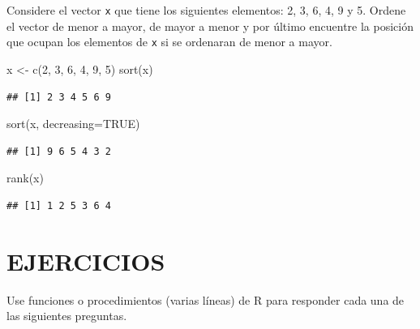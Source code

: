 \documentclass[
]{book}
\makeatletter
\newenvironment{Shaded}{\begin{snugshade}}{\end{snugshade}}
\newcommand{\AttributeTok}[1]{\textcolor[rgb]{0.77,0.63,0.00}{#1}}
\newcommand{\ConstantTok}[1]{\textcolor[rgb]{0.00,0.00,0.00}{#1}}
\newcommand{\DecValTok}[1]{\textcolor[rgb]{0.00,0.00,0.81}{#1}}
\newcommand{\FunctionTok}[1]{\textcolor[rgb]{0.00,0.00,0.00}{#1}}
\newcommand{\NormalTok}[1]{#1}
\newcommand{\OtherTok}[1]{\textcolor[rgb]{0.56,0.35,0.01}{#1}}
\newenvironment{kframe}{%
\medskip{}
\setlength{\fboxsep}{.8em}
 \def\at@end@of@kframe{}%
 \ifinner\ifhmode%
  \def\at@end@of@kframe{\end{minipage}}%
  \begin{minipage}{\columnwidth}%
 \fi\fi%
 \def\FrameCommand##1{\hskip\@totalleftmargin \hskip-\fboxsep
 \colorbox{shadecolor}{##1}\hskip-\fboxsep
     \hskip-\linewidth \hskip-\@totalleftmargin \hskip\columnwidth}%
 \MakeFramed {\advance\hsize-\width
   \@totalleftmargin\z@ \linewidth\hsize
   \@setminipage}}%
 {\par\unskip\endMakeFramed%
 \at@end@of@kframe}
\renewenvironment{Shaded}{\begin{kframe}}{\end{kframe}}
\makeatother
\begin{document}
Considere el vector \texttt{x} que tiene los siguientes elementos: 2, 3, 6, 4, 9 y 5. Ordene el vector de menor a mayor, de mayor a menor y por último encuentre la posición que ocupan los elementos de \texttt{x} si se ordenaran de menor a mayor.

\begin{Shaded}
\begin{Highlighting}[]
\NormalTok{x }\OtherTok{\textless{}{-}} \FunctionTok{c}\NormalTok{(}\DecValTok{2}\NormalTok{, }\DecValTok{3}\NormalTok{, }\DecValTok{6}\NormalTok{, }\DecValTok{4}\NormalTok{, }\DecValTok{9}\NormalTok{, }\DecValTok{5}\NormalTok{)}
\FunctionTok{sort}\NormalTok{(x)}
\end{Highlighting}
\end{Shaded}

\begin{verbatim}
## [1] 2 3 4 5 6 9
\end{verbatim}

\begin{Shaded}
\begin{Highlighting}[]
\FunctionTok{sort}\NormalTok{(x, }\AttributeTok{decreasing=}\ConstantTok{TRUE}\NormalTok{)}
\end{Highlighting}
\end{Shaded}

\begin{verbatim}
## [1] 9 6 5 4 3 2
\end{verbatim}

\begin{Shaded}
\begin{Highlighting}[]
\FunctionTok{rank}\NormalTok{(x)}
\end{Highlighting}
\end{Shaded}

\begin{verbatim}
## [1] 1 2 5 3 6 4
\end{verbatim}

\hypertarget{ejercicios-1}{%
\section*{EJERCICIOS}\label{ejercicios-1}}

Use funciones o procedimientos (varias líneas) de R para responder cada una de las siguientes preguntas.
\end{document}
